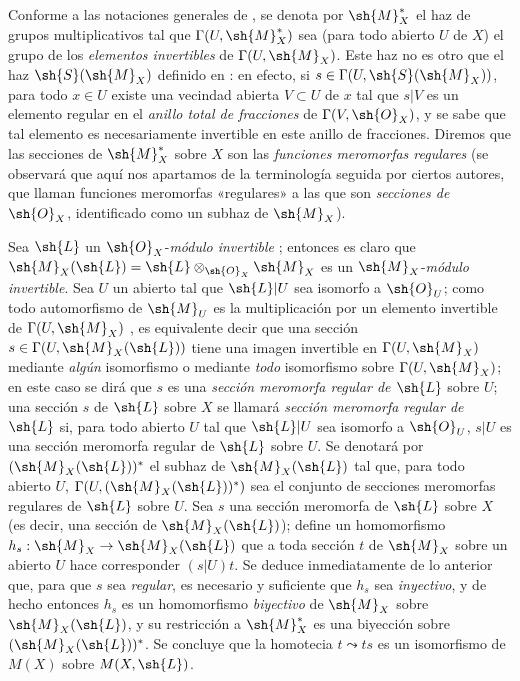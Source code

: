 \begin{env}[20.1.8]
\label{IV.20.1.8}
Conforme a las notaciones generales de , se denota por $\sh{M}_X^*$ el haz de grupos multiplicativos tal que $\Gamma(U,\sh{M}_X^*)$ sea (para todo abierto $U$ de $X$) el grupo de los \emph{elementos invertibles} de $\Gamma(U,\sh{M}_X)$.
Este haz no es otro que el haz $\sh{S}(\sh{M}_X)$ definido en : en efecto, si $s\in\Gamma(U,\sh{S}(\sh{M}_X))$, para todo $x\in U$ existe una vecindad abierta $V\subset U$ de $x$ tal que $s|V$ es un elemento regular en el \emph{anillo total de fracciones} de $\Gamma(V,\sh{O}_X)$, y se sabe que tal elemento es necesariamente invertible en este anillo de fracciones.
Diremos que las secciones de $\sh{M}_X^*$ sobre $X$ son las \emph{funciones meromorfas regulares} (se observará que aquí nos apartamos de la terminología seguida por ciertos autores, que llaman funciones meromorfas «regulares» a las que son \emph{secciones de $\sh{O}_X$}, identificado como un subhaz de $\sh{M}_X$).

Sea $\sh{L}$ un $\sh{O}_X$-\emph{módulo invertible} ; entonces es claro que $\sh{M}_X(\sh{L})=\sh{L}\otimes_{\sh{O}_X}\sh{M}_X$
es un $\sh{M}_X$-\emph{módulo invertible}.
Sea $U$ un abierto tal que $\sh{L}|U$ sea isomorfo a $\sh{O}_U$; como todo automorfismo de $\sh{M}_U$ es la multiplicación por un elemento invertible de $\Gamma(U,\sh{M}_X)$ , es equivalente decir que una sección $s\in\Gamma(U,\sh{M}_X(\sh{L}))$ tiene una imagen invertible en $\Gamma(U,\sh{M}_X)$ mediante \emph{algún} isomorfismo o mediante \emph{todo} isomorfismo sobre $\Gamma(U,\sh{M}_X)$; en este caso se dirá que $s$ es una \emph{sección meromorfa regular de $\sh{L}$} sobre $U$; una sección $s$ de $\sh{L}$ sobre $X$ se llamará \emph{sección meromorfa regular de $\sh{L}$} si, para todo abierto $U$ tal que $\sh{L}|U$ sea isomorfo a $\sh{O}_U$, $s|U$ es una sección meromorfa regular de $\sh{L}$ sobre $U$.
Se denotará por $(\sh{M}_X(\sh{L}))^*$ el subhaz de $\sh{M}_X(\sh{L})$ tal que, para todo abierto $U$, $\Gamma(U,(\sh{M}_X(\sh{L}))^*)$ sea el conjunto de secciones meromorfas regulares de $\sh{L}$ sobre $U$.
Sea $s$ una sección meromorfa de $\sh{L}$ sobre $X$ (es decir, una sección de $\sh{M}_X(\sh{L})$); define un homomorfismo $h_s:\sh{M}_X\to\sh{M}_X(\sh{L})$ que a toda sección $t$ de $\sh{M}_X$ sobre un abierto $U$ hace corresponder $(s|U)t$.
Se deduce inmediatamente de lo anterior que, para que $s$ sea \emph{regular}, es necesario y suficiente que $h_s$ sea \emph{inyectivo}, y de hecho entonces $h_s$ es un homomorfismo \emph{biyectivo} de $\sh{M}_X$ sobre $\sh{M}_X(\sh{L})$, y su restricción a $\sh{M}_X^*$ es una biyección sobre $(\sh{M}_X(\sh{L}))^*$.
Se concluye que la homotecia $t\leadsto ts$ es un isomorfismo de $M(X)$ sobre $M(X,\sh{L})$.
\end{env}

